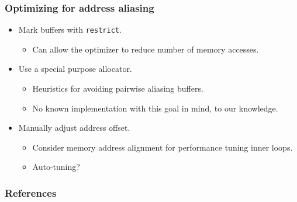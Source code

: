 \documentclass{beamer}
\begin{document}
\begin{frame}
\frametitle{Optimizing for address aliasing}


\begin{itemize}
  \item Mark buffers with \texttt{restrict}.
  \begin{itemize}
    \item Can allow the optimizer to reduce number of memory accesses.
  \end{itemize}
  \item Use a special purpose allocator.
  \begin{itemize}
    \item Heuristics for avoiding pairwise aliasing buffers.
    \item No known implementation with this goal in mind, to our knowledge.
  \end{itemize}
  \item Manually adjust address offset.
  \begin{itemize}
    \item Consider memory address alignment for performance tuning inner loops.
    \item Auto-tuning?
  \end{itemize}
\end{itemize}

\end{frame}


\begin{frame}

\frametitle{References}

\scriptsize{}


\end{frame}
\end{document}
